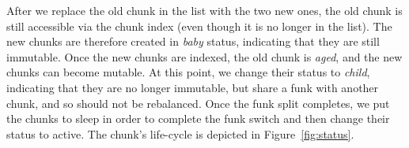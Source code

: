 After we replace the old chunk in the list with the two new ones, 
the old chunk is still accessible via the chunk index (even though it is no longer in the list). 
The new chunks are therefore created in \emph{baby} status, indicating that they are still immutable. 
Once the new chunks are indexed, the old chunk is \emph{aged}, and the new chunks can become mutable.
At this point, we change their status to \emph{child}, indicating that they are no longer immutable, but share a funk with another chunk,
and so should not be rebalanced. Once the funk split completes, we put the chunks to sleep in order
to complete the funk switch and then change their  status  to active. 
The chunk's life-cycle is depicted in Figure~\ref{fig:status}.











